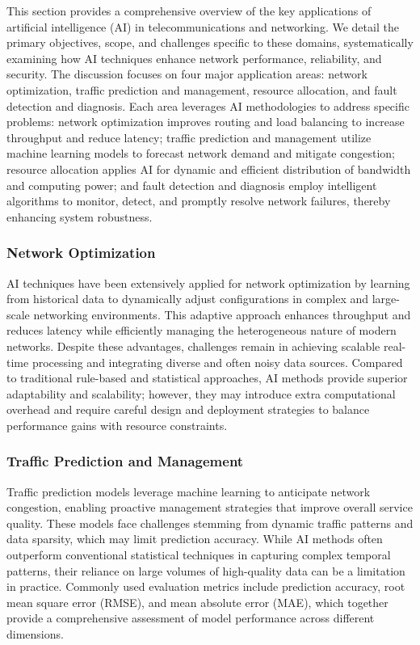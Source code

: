 \documentclass[sigconf]{acmart}
\begin{document}
This section provides a comprehensive overview of the key applications of artificial intelligence (AI) in telecommunications and networking. We detail the primary objectives, scope, and challenges specific to these domains, systematically examining how AI techniques enhance network performance, reliability, and security. The discussion focuses on four major application areas: network optimization, traffic prediction and management, resource allocation, and fault detection and diagnosis. Each area leverages AI methodologies to address specific problems: network optimization improves routing and load balancing to increase throughput and reduce latency; traffic prediction and management utilize machine learning models to forecast network demand and mitigate congestion; resource allocation applies AI for dynamic and efficient distribution of bandwidth and computing power; and fault detection and diagnosis employ intelligent algorithms to monitor, detect, and promptly resolve network failures, thereby enhancing system robustness.

\subsubsection{Network Optimization}
AI techniques have been extensively applied for network optimization by learning from historical data to dynamically adjust configurations in complex and large-scale networking environments. This adaptive approach enhances throughput and reduces latency while efficiently managing the heterogeneous nature of modern networks. Despite these advantages, challenges remain in achieving scalable real-time processing and integrating diverse and often noisy data sources. Compared to traditional rule-based and statistical approaches, AI methods provide superior adaptability and scalability; however, they may introduce extra computational overhead and require careful design and deployment strategies to balance performance gains with resource constraints.

\subsubsection{Traffic Prediction and Management}
Traffic prediction models leverage machine learning to anticipate network congestion, enabling proactive management strategies that improve overall service quality. These models face challenges stemming from dynamic traffic patterns and data sparsity, which may limit prediction accuracy. While AI methods often outperform conventional statistical techniques in capturing complex temporal patterns, their reliance on large volumes of high-quality data can be a limitation in practice. Commonly used evaluation metrics include prediction accuracy, root mean square error (RMSE), and mean absolute error (MAE), which together provide a comprehensive assessment of model performance across different dimensions.
\end{document}
